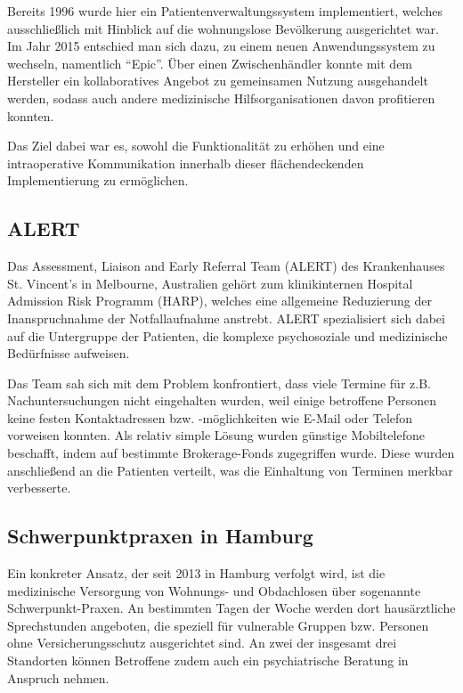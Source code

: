 Bereits 1996 wurde hier ein Patientenverwaltungssystem implementiert, welches ausschließlich mit Hinblick auf die wohnungslose Bevölkerung ausgerichtet war. Im Jahr 2015 entschied man sich dazu, zu einem neuen Anwendungssystem zu wechseln, namentlich \enquote{Epic}. Über einen Zwischenhändler konnte mit dem Hersteller ein kollaboratives Angebot zu gemeinsamen Nutzung ausgehandelt werden, sodass auch andere medizinische Hilfsorganisationen davon profitieren konnten.

Das Ziel dabei war es, sowohl die Funktionalität zu erhöhen und eine intraoperative Kommunikation innerhalb dieser flächendeckenden Implementierung zu ermöglichen. \citep{Angoff.2019}

\newpage
\subsection{ALERT}

Das Assessment, Liaison and Early Referral Team (ALERT) des Krankenhauses St. Vincent's in Melbourne, Australien gehört zum klinikinternen Hospital Admission Risk Programm (HARP), welches eine allgemeine Reduzierung der Inanspruchnahme der Notfallaufnahme anstrebt. ALERT spezialisiert sich dabei auf die Untergruppe der Patienten, die komplexe psychosoziale und medizinische Bedürfnisse aufweisen.

Das Team sah sich mit dem Problem konfrontiert, dass viele Termine für z.B. Nachuntersuchungen nicht eingehalten wurden, weil einige betroffene Personen keine festen Kontaktadressen bzw. -möglichkeiten wie E-Mail oder Telefon vorweisen konnten. Als relativ simple Lösung wurden günstige Mobiltelefone beschafft, indem auf bestimmte Brokerage-Fonds zugegriffen wurde. Diese wurden anschließend an die Patienten verteilt, was die Einhaltung von Terminen merkbar verbesserte. \citep{Davies.2018}

\subsection{Schwerpunktpraxen in Hamburg}

Ein konkreter Ansatz, der seit 2013 in Hamburg verfolgt wird, ist die medizinische Versorgung von Wohnungs- und Obdachlosen über sogenannte Schwerpunkt-Praxen. An bestimmten Tagen der Woche werden dort hausärztliche Sprechstunden angeboten, die speziell für vulnerable Gruppen bzw. Personen ohne Versicherungsschutz ausgerichtet sind. An zwei der insgesamt drei Standorten können Betroffene zudem auch ein psychiatrische Beratung in Anspruch nehmen.

